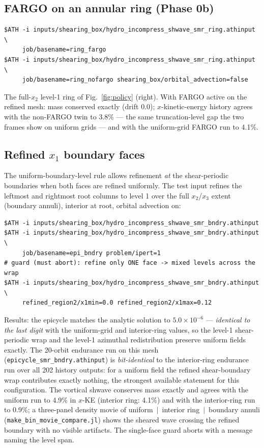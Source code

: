 \documentclass[11pt]{article}
\newcommand{\code}[1]{\texttt{#1}}
\begin{document}
\subsection{FARGO on an annular ring (Phase 0b)}
\begin{lstlisting}
$ATH -i inputs/shearing_box/hydro_incompress_shwave_smr_ring.athinput \
     job/basename=ring_fargo
$ATH -i inputs/shearing_box/hydro_incompress_shwave_smr_ring.athinput \
     job/basename=ring_nofargo shearing_box/orbital_advection=false
\end{lstlisting}
The full-$x_2$ level-1 ring of Fig.~\ref{fig:policy} (right). With FARGO active on
the refined mesh: mass conserved exactly (drift $0.0$); $x$-kinetic-energy history
agrees with the non-FARGO twin to 3.8\% --- the same truncation-level gap the two
frames show on uniform grids --- and with the uniform-grid FARGO run to 4.1\%.

\subsection{Refined $x_1$ boundary faces}
\label{sec:t_bndry}
The uniform-boundary-level rule allows refinement \emph{at} the shear-periodic
boundaries when both faces are refined uniformly. The test input refines the
leftmost and rightmost root columns to level 1 over the full $x_2$/$x_3$ extent
(boundary annuli), interior at root, orbital advection on:
\begin{lstlisting}
$ATH -i inputs/shearing_box/hydro_incompress_shwave_smr_bndry.athinput
$ATH -i inputs/shearing_box/hydro_incompress_shwave_smr_bndry.athinput \
     job/basename=epi_bndry problem/ipert=1
# guard (must abort): refine only ONE face -> mixed levels across the wrap
$ATH -i inputs/shearing_box/hydro_incompress_shwave_smr_bndry.athinput \
     refined_region2/x1min=0.0 refined_region2/x1max=0.12
\end{lstlisting}
Results: the epicycle matches the analytic solution to $5.0\times10^{-6}$ ---
\emph{identical to the last digit} with the uniform-grid and interior-ring values,
so the level-1 shear-periodic wrap and the level-1 azimuthal redistribution preserve
uniform fields exactly. The 20-orbit endurance run on this mesh
(\code{epicycle\_smr\_bndry.athinput}) is \emph{bit-identical} to the interior-ring
endurance run over all 202 history outputs: for a uniform field the refined
shear-boundary wrap contributes exactly nothing, the strongest available statement
for this configuration. The vortical shwave conserves mass exactly and agrees with
the uniform run to 4.9\% in $x$-KE (interior ring: 4.1\%) and with the interior-ring
run to 0.9\%; a three-panel density movie of uniform~$|$~interior ring~$|$~boundary
annuli (\code{make\_bin\_movie\_compare.jl}) shows the sheared wave crossing the
refined boundary with no visible artifacts. The single-face guard aborts with a
message naming the level span.
\end{document}
